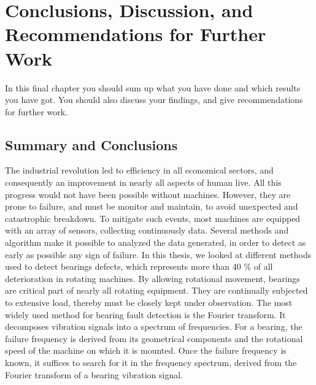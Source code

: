 \documentclass[thesis.tex]{subfiles}
\begin{document}
	\chapter[Conclusions]{Conclusions, Discussion, and Recommendations for Further Work}
	\label{ch:conclusions}
	In this final chapter you should sum up what you have done and which results you have got. 
	You should also discuss your findings, and give recommendations for further work.
	
	\section{Summary and Conclusions}
	\label{sec:summary_and_conclusions}
	The industrial revolution led to efficiency in all economical sectors, and consequently an improvement in nearly all aspects of human live. All this progress would not have been possible without machines. However, they are prone to failure, and must be monitor and maintain, to avoid unexpected and catastrophic breakdown. To mitigate such events, most machines are equipped with an array of sensors, collecting continuously data. Several methods and algorithm make it possible to analyzed the data generated, in order to detect as early as possible any sign of failure.
	\justify
	In this thesis, we looked at different methods used to detect bearings defects, which represents more than 40 $\%$ of all deterioration in rotating machines. By allowing rotational movement, bearings are critical part of nearly all rotating equipment. They are continually subjected to extensive load, thereby must be closely kept under observation. The most widely used method for bearing fault detection is the Fourier transform. It decomposes vibration signals into a spectrum of frequencies. For a bearing, the failure frequency is derived from its geometrical components and the rotational speed of the machine on which it is mounted. Once the failure frequency is known, it suffices to search for it in the frequency spectrum, derived from the Fourier transform of a bearing vibration signal.
\end{document}
